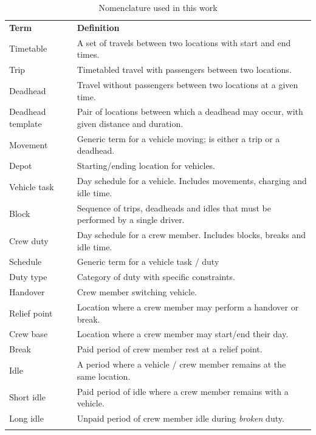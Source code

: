\documentclass[]{article}
\begin{document}
\begin{table}[h]
  \centering
  \begin{tabular}{ll}
    \toprule
    \multicolumn{1}{l}{\textbf{Term}} & \multicolumn{1}{l}{\textbf{Definition}} \\
    Timetable & A set of travels between two locations with start and end times. \\  
    Trip & Timetabled travel with passengers between two locations. \\
    Deadhead & Travel without passengers between two locations at a given time. \\
    Deadhead template & Pair of locations between which a deadhead may occur, with given distance and duration. \\
    Movement & Generic term for a vehicle moving; is either a trip or a deadhead. \\
    Depot & Starting/ending location for vehicles. \\
    Vehicle task & Day schedule for a vehicle. Includes movements, charging and idle time. \\
    Block & Sequence of trips, deadheads and idles that must be performed by a single driver. \\
    Crew duty & Day schedule for a crew member. Includes blocks, breaks and idle time. \\
    Schedule & Generic term for a vehicle task / duty \\ 
    Duty type & Category of duty with specific constraints. \\
    Handover & Crew member switching vehicle. \\ 
    Relief point & Location where a crew member may perform a handover or break. \\
    Crew base & Location where a crew member may start/end their day. \\    
    Break & Paid period of crew member rest at a relief point. \\ 
    Idle & A period where a vehicle / crew member remains at the same location. \\
    Short idle & Paid period of idle where a crew member remains with a vehicle. \\ 
    Long idle & Unpaid period of crew member idle during \textit{broken} duty. \\
    \addlinespace[0.2em]
    \bottomrule
  \end{tabular}
  \caption{Nomenclature used in this work}
  \label{tab:nomenclature}
\end{table}
\end{document}
